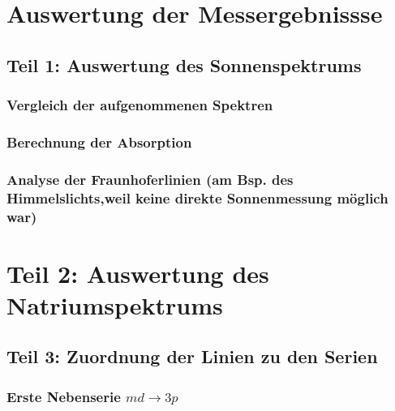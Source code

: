 \documentclass[DIV=13]{scrartcl}
\begin{document}
\section*{Auswertung der Messergebnissse}
\subsection*{Teil 1: Auswertung des Sonnenspektrums}


\subsubsection*{Vergleich der aufgenommenen Spektren}

\subsubsection*{Berechnung der Absorption}

\subsubsection*{Analyse der Fraunhoferlinien (am Bsp. des Himmelslichts,weil keine direkte Sonnenmessung möglich war)}



\section*{Teil 2: Auswertung des Natriumspektrums}







\subsection*{Teil 3: Zuordnung der Linien zu den Serien}
\subsubsection*{Erste Nebenserie $ md \rightarrow 3p$ }

\end{document}
